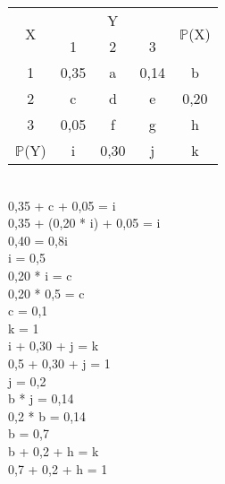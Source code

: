 \documentclass[12pt,a4paper]{article}
\begin{document}
	\begin{center}
		\begin{tabular}{|c|c|c|c|c|}\hline
			\multirow{2}{*}{X} & \multicolumn{3}{c|}{Y} & \multirow{2}{*}{$\mathbb{P}$(X)}\\ \cline{2-4}
			& 1 & 2 & 3 & \\ \hline
			1 & 0,35 & a & 0,14 & b\\ \hline
			2 & c & d & e & 0,20\\ \hline
			3 & 0,05 & f & g & h \\ \hline
			$\mathbb{P}$(Y) & i & 0,30 & j & k\\ \hline	
		\end{tabular}
		\vspace{1cm}\\
		0,35 + c + 0,05 = i
		\vspace{0.25cm}\\
		0,35 + (0,20 * i) + 0,05 = i
		\vspace{0.25cm}\\
		0,40 = 0,8i
		\vspace{0.25cm}\\
		i = 0,5
		\vspace{1cm}\\
		0,20 * i = c 
		\vspace{0.25cm}\\
		0,20 * 0,5 = c
		\vspace{0.25cm}\\
		c = 0,1
		\vspace{1cm}\\
		k = 1
		\vspace{1cm}\\
		i + 0,30 + j = k
		\vspace{0.25cm}\\
		0,5 + 0,30 + j = 1
		\vspace{0.25cm}\\
		j = 0,2
		\vspace{1cm}\\
		b * j = 0,14
		\vspace{0.25cm}\\
		0,2 * b = 0,14
		\vspace{0.25cm}\\
		b = 0,7
		\vspace{1cm}\\
		b + 0,2 + h = k
		\vspace{0.25cm}\\
		0,7 + 0,2 + h = 1
		\vspace{0.25cm}\\

\end{center}
\end{document}
